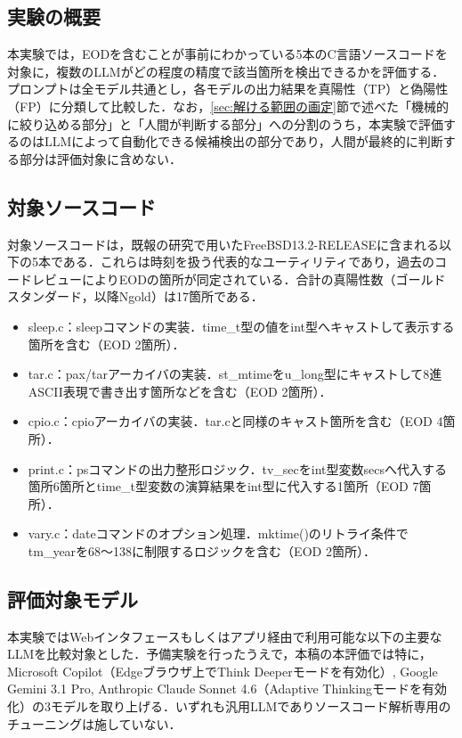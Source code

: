\documentclass[submit,techrep,noauthor]{ipsj-lualatex}
\begin{document}
\subsection{実験の概要}

本実験では，EODを含むことが事前にわかっている5本のC言語ソースコードを対象に，複数のLLMがどの程度の精度で該当箇所を検出できるかを評価する．プロンプトは全モデル共通とし，各モデルの出力結果を真陽性（TP）と偽陽性（FP）に分類して比較した．なお，\ref{sec:解ける範囲の画定}節で述べた「機械的に絞り込める部分」と「人間が判断する部分」への分割のうち，本実験で評価するのはLLMによって自動化できる候補検出の部分であり，人間が最終的に判断する部分は評価対象に含めない．

\subsection{対象ソースコード}
\label{sec:対象ソースコード}

対象ソースコードは，既報の研究で用いたFreeBSD13.2-RELEASE\cite{ref3}に含まれる以下の5本である．これらは時刻を扱う代表的なユーティリティであり，過去のコードレビューによりEODの箇所が同定されている．合計の真陽性数（ゴールドスタンダード，以降Ngold）は17箇所である．

\begin{itemize}
	\item sleep.c：sleepコマンドの実装．time\_t型の値をint型へキャストして表示する箇所を含む（EOD 2箇所）．
	\item tar.c：pax/tarアーカイバの実装．st\_mtimeをu\_long型にキャストして8進ASCII表現で書き出す箇所などを含む（EOD 2箇所）．
	\item cpio.c：cpioアーカイバの実装．tar.cと同様のキャスト箇所を含む（EOD 4箇所）．
	\item print.c：psコマンドの出力整形ロジック．tv\_secをint型変数secsへ代入する箇所6箇所とtime\_t型変数の演算結果をint型に代入する1箇所（EOD 7箇所）．
	\item vary.c：dateコマンドのオプション処理．mktime()のリトライ条件でtm\_yearを68～138に制限するロジックを含む（EOD 2箇所）．
\end{itemize}

\subsection{評価対象モデル}

本実験ではWebインタフェースもしくはアプリ経由で利用可能な以下の主要なLLMを比較対象とした．予備実験を行ったうえで，本稿の本評価では特に，Microsoft Copilot（Edgeブラウザ上でThink Deeperモードを有効化）, Google Gemini 3.1 Pro, Anthropic Claude Sonnet 4.6（Adaptive Thinkingモードを有効化）の3モデルを取り上げる．いずれも汎用LLMでありソースコード解析専用のチューニングは施していない．
\end{document}

